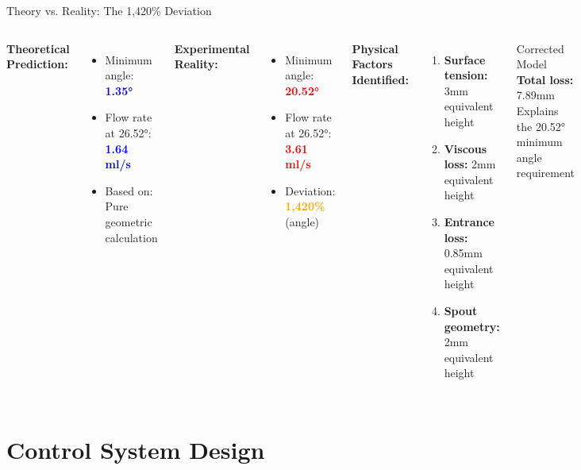 \documentclass[aspectratio=169]{beamer}
\begin{document}
\begin{frame}{Theory vs. Reality: The 1,420\% Deviation}
\begin{columns}[T]
\textbf{Theoretical Prediction:}
\begin{itemize}
    \item Minimum angle: \textcolor{blue}{\textbf{1.35°}}
    \item Flow rate at 26.52°: \textcolor{blue}{\textbf{1.64 ml/s}}
    \item Based on: Pure geometric calculation
\end{itemize}

\textbf{Experimental Reality:}
\begin{itemize}
    \item Minimum angle: \textcolor{red}{\textbf{20.52°}}
    \item Flow rate at 26.52°: \textcolor{red}{\textbf{3.61 ml/s}}
    \item Deviation: \textcolor{orange}{\textbf{1,420\%}} (angle)
\end{itemize}

\textbf{Physical Factors Identified:}
\begin{enumerate}
    \item \textbf{Surface tension:} 3mm equivalent height
    \item \textbf{Viscous loss:} 2mm equivalent height
    \item \textbf{Entrance loss:} 0.85mm equivalent height
    \item \textbf{Spout geometry:} 2mm equivalent height
\end{enumerate}

\begin{exampleblock}{Corrected Model}
\textbf{Total loss:} 7.89mm\\
Explains the 20.52° minimum angle requirement
\end{exampleblock}
\end{columns}
\end{frame}

\section{Control System Design}
\end{document}
